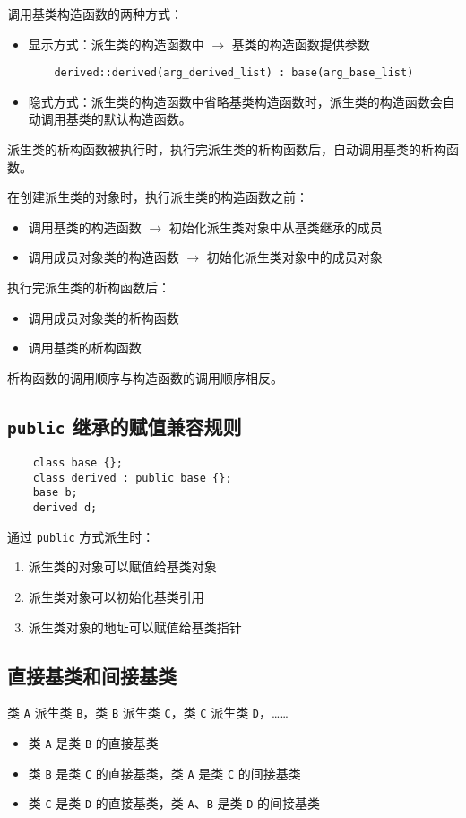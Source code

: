 \documentclass[UTF8]{ctexart}
\begin{document}
调用基类构造函数的两种方式：
\begin{itemize}
    \item 显示方式：派生类的构造函数中 $\rightarrow$ 基类的构造函数提供参数
    \begin{verbatim}
    derived::derived(arg_derived_list) : base(arg_base_list)
    \end{verbatim}
    \item 隐式方式：派生类的构造函数中省略基类构造函数时，派生类的构造函数会自动调用基类的默认构造函数。
\end{itemize}

派生类的析构函数被执行时，执行完派生类的析构函数后，自动调用基类的析构函数。

在创建派生类的对象时，执行派生类的构造函数之前：
\begin{itemize}
    \item 调用基类的构造函数 $\rightarrow$ 初始化派生类对象中从基类继承的成员
    \item 调用成员对象类的构造函数 $\rightarrow$ 初始化派生类对象中的成员对象
\end{itemize}

执行完派生类的析构函数后：
\begin{itemize}
    \item 调用成员对象类的析构函数
    \item 调用基类的析构函数
\end{itemize}

析构函数的调用顺序与构造函数的调用顺序相反。

\subsection{\texttt{public} 继承的赋值兼容规则}
\begin{verbatim}
    class base {};
    class derived : public base {};
    base b;
    derived d;
\end{verbatim}

通过 \texttt{public} 方式派生时：
\begin{enumerate}
    \item 派生类的对象可以赋值给基类对象
    \item 派生类对象可以初始化基类引用
    \item 派生类对象的地址可以赋值给基类指针
\end{enumerate}

\subsection{直接基类和间接基类}
类 \texttt{A} 派生类 \texttt{B}，类 \texttt{B} 派生类 \texttt{C}，类 \texttt{C} 派生类 \texttt{D}，……
\begin{itemize}
    \item 类 \texttt{A} 是类 \texttt{B} 的直接基类
    \item 类 \texttt{B} 是类 \texttt{C} 的直接基类，类 \texttt{A} 是类 \texttt{C} 的间接基类
    \item 类 \texttt{C} 是类 \texttt{D} 的直接基类，类 \texttt{A}、\texttt{B} 是类 \texttt{D} 的间接基类
\end{itemize}
\end{document}
